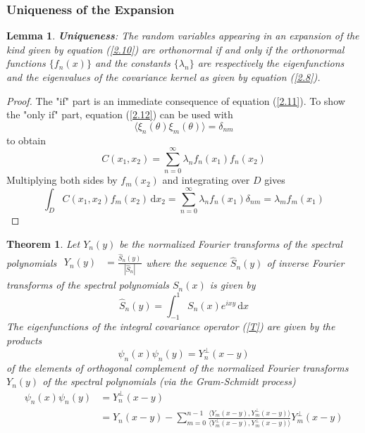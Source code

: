 \documentclass{article}
\newtheorem{theorem}{Theorem}
\newtheorem{lemma}{Lemma}
\begin{document}
\subsubsection{Uniqueness of the Expansion}

\begin{lemma}
\textbf{Uniqueness}: The random variables appearing in an expansion of
the kind given by equation (\ref{2.10}) are orthonormal if and only if the
orthonormal functions $\{f_n (x)\}$ and the constants $\{\lambda_n \}$ are
respectively the eigenfunctions and the eigenvalues of the covariance kernel
as given by equation (\ref{2.8}).
\end{lemma}

\begin{proof}
The "if" part is an immediate consequence of equation (\ref{2.11}). To show
the "only if" part, equation (\ref{2.12}) can be used with
\begin{equation}
\langle \xi_n (\theta) \xi_m (\theta) \rangle = \delta_{nm}
\end{equation}
to obtain
\begin{equation}
C (x_1, x_2) = \sum_{n = 0}^{\infty} \lambda_n f_n (x_1) f_n (x_2)
\end{equation}
Multiplying both sides by $f_m (x_2)$ and integrating over $D$ gives
\begin{equation}
\int_D C (x_1, x_2) f_m (x_2) \, \mathrm{d}x_2 = \sum_{n = 0}^{\infty} \lambda_n f_n
(x_1) \delta_{nm} = \lambda_m f_m (x_1)
\end{equation}
\end{proof}

\begin{theorem}
Let $Y_n (y)$ be the normalized Fourier transforms of the spectral
polynomials $\begin{array}{ll}
Y_n (y) & = \frac{\hat{S}_n (y)}{| \hat{S}_n |}
\end{array}$where the sequence $\hat{S}_n (y)$ of inverse Fourier transforms
of the spectral polynomials $S_n (x)$ is given by
\begin{equation}
\hat{S}_n (y) = \int_{- 1}^1 S_n (x) e^{i x y} \, \mathrm{d}x
\end{equation}
The eigenfunctions of the integral covariance operator (\ref{T}) are given
by the products
\begin{equation}
\psi_n (x) \psi_n (y) = Y^{\perp}_n (x - y)
\end{equation}
of the elements of orthogonal complement of the normalized Fourier
transforms $Y_n (y)$ of the spectral polynomials (via the Gram-Schmidt
process)
\begin{equation}
\begin{array}{ll}
\psi_n (x) \psi_n (y) & = Y^{\perp}_n (x - y)\\
& = Y_n (x - y) - \sum_{m = 0}^{n - 1} \frac{\langle Y_m (x - y),
Y^{\perp}_m (x - y) \rangle}{\langle Y^{\perp}_m (x - y), Y^{\perp}_m (x
- y) \rangle} Y^{\perp}_m (x - y)
\end{array}
\end{equation}
\end{theorem}
\end{document}

